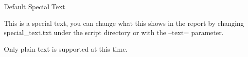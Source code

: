 \documentclass[12pt, landscape]{article}
\begin{document}
\begin{minipage}[t][17cm][t]{\textwidth}
\begin{multicols}{2}

 
\begin{minipage}{0.45\textwidth}{\fontsize{30}{40}\selectfont Default Special Text
 }\\\begin{addmargin}[1em]{0em}{\fontsize{16}{20}\selectfont This is a special text, you can change what this shows in the report by changing special\_text.txt under the script directory or with the --text= parameter.
 \par}{\fontsize{16}{20}\selectfont Only plain text is supported at this time.
 \par}\end{addmargin}\end{minipage}\\

\end{multicols}
\end{minipage}

\noindent\hdashrule[0cm]{39.5cm}{1pt}{2pt}
\end{document}
